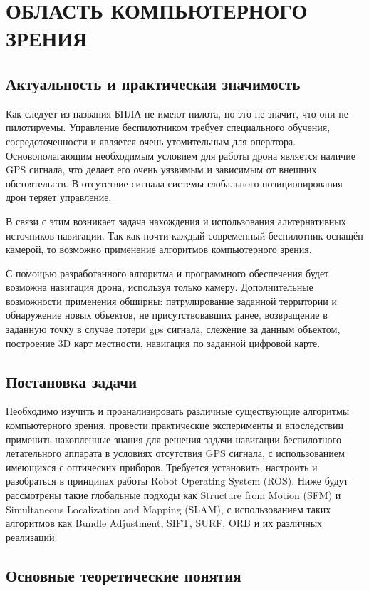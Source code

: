 \chapter{ОБЛАСТЬ КОМПЬЮТЕРНОГО ЗРЕНИЯ}

\section{Актуальность и практическая значимость}

Как следует из названия БПЛА не имеют пилота, но это не значит, что они не пилотируемы. Управление беспилотником требует специального обучения, сосредоточенности и является очень утомительным для оператора. Основополагающим необходимым условием для работы дрона является наличие GPS сигнала, что делает его очень уязвимым и зависимым от внешних обстоятельств. В отсутствие сигнала системы глобального позиционирования дрон теряет управление.

В связи с этим возникает задача нахождения и использования альтернативных источников навигации. Так как почти каждый современный беспилотник оснащён камерой, то возможно применение алгоритмов компьютерного зрения.

С помощью разработанного алгоритма и программного обеспечения будет возможна навигация дрона, используя только камеру. Дополнительные возможности применения обширны: патрулирование заданной территории и обнаружение новых объектов, не присутствовавших ранее, возвращение в заданную точку в случае потери gps сигнала, слежение за данным объектом, построение 3D карт местности, навигация по заданной цифровой карте.

\section{Постановка задачи}

Необходимо изучить и проанализировать различные существующие алгоритмы компьютерного зрения, провести практические эксперименты и впоследствии применить накопленные знания для решения задачи навигации беспилотного летательного аппарата в условиях отсутствия GPS сигнала, с использованием имеющихся с оптических приборов. Требуется установить, настроить и разобраться в принципах работы Robot Operating System (ROS). Ниже будут рассмотрены такие глобальные подходы как Structure from Motion (SFM) и Simultaneous Localization and Mapping (SLAM), с использованием таких алгоритмов как Bundle Adjustment, SIFT, SURF, ORB и их различных реализаций.

\section{Основные теоретические понятия}

